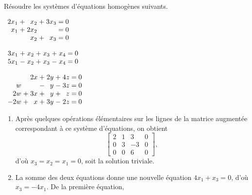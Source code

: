\begin{exercice}
  Résoudre les systèmes d'équations homogènes suivants.
  \begin{enumerate}
    \begin{multicols}{2}
    \item $%
      \begin{array}[t]{*{2}{r@{\;}c@{\;}}r@{\;=\;}r}
        2x_1 &+&  x_2 &+& 3x_3 & 0 \\
        x_1 &+& 2x_2 & &      & 0 \\
        & &  x_2 &+&  x_3 & 0
      \end{array}$
    \item $%
      \begin{array}[t]{*{3}{r@{\;}c@{\;}}r@{\;=\;}r}
        3x_1 &+&   x_2 &+&  x_3 &+&  x_4 & 0 \\
        5x_1 &-&   x_2 &+&  x_3 &-&  x_4 & 0
      \end{array}$
    \end{multicols}
    \begin{multicols}{2}
    \item $%
      \begin{array}[t]{*{3}{r@{\;}c@{\;}}r@{\;=\;}r}
        & & 2x &+& 2y &+& 4z & 0 \\
        w & &    &-&  y &-& 3z & 0 \\
        2w &+& 3x &+&  y &+&  z & 0 \\
        -2w &+&  x &+& 3y &-& 2z & 0
      \end{array}$
    \end{multicols}
  \end{enumerate}
  \begin{sol}
    \begin{enumerate}
    \item Après quelques opérations élémentaires sur les lignes de la
      matrice augmentée correspondant à ce système d'équations, on
      obtient
      \begin{displaymath}
        \begin{bmatrix}
          2 & 1 &  3 & 0 \\
          0 & 3 & -3 & 0 \\
          0 & 0 &  6 & 0
        \end{bmatrix},
      \end{displaymath}
      d'où $x_3 = x_2 = x_1 = 0$, soit la solution triviale.
    \item La somme des deux équations donne une nouvelle équation
      $4x_1 + x_3 = 0$, d'où $x_3 = -4 x_1$. De la première équation,

\end{enumerate}
\end{sol}
\end{exercice}
